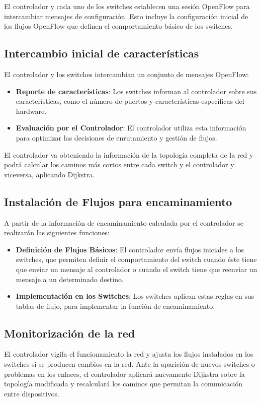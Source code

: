 \documentclass[a4paper, 12pt]{book}
\begin{document}
	
	El controlador y cada uno de los switches establecen una sesión OpenFlow para intercambiar mensajes de configuración. Esto incluye la configuración inicial de los flujos OpenFlow que definen el comportamiento básico de los switches.

	
	\subsection{Intercambio inicial de características}
	El controlador y los switches intercambian un conjunto de mensajes OpenFlow:
	\begin{itemize}
		\item \textbf{Reporte de características}: Los switches informan al controlador sobre sus características, como el número de puertos y características específicas del hardware.
		\item \textbf{Evaluación por el Controlador}: El controlador utiliza esta información para optimizar las decisiones de enrutamiento y gestión de flujos.
	\end{itemize}
	
	El controlador va obteniendo la información de la topología completa de la red y podrá calcular los caminos más cortos entre cada switch y el controlador y viceversa, aplicando Dijkstra.
	
	\subsection{Instalación de Flujos para encaminamiento}
	A partir de la información de encaminamiento calculada por el controlador se realizarán las siguientes funciones:
	\begin{itemize}
		\item \textbf{Definición de Flujos Básicos}: El controlador envía flujos iniciales a los switches, que permiten definir el comportamiento del switch cuando éste tiene que enviar un mensaje al controlador o cuando el switch tiene que reenviar un mensaje a un determinado destino.
		\item \textbf{Implementación en los Switches}: Los switches aplican estas reglas en sus tablas de flujo, para implementar la función de encaminamiento.
	\end{itemize}
	
	\subsection{Monitorización de la red}
		El controlador vigila el funcionamiento la red y ajusta los flujos instalados en los switches si se producen cambios en la red.
		Ante la aparición de nuevos switches o problemas en los enlaces, el controlador aplicará nuevamente Dijkstra sobre la topología modificada y recalculará los caminos que permitan la comunicación entre dispositivos.
	
\end{document}
